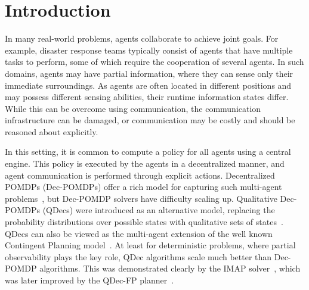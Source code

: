 \documentclass[letterpaper]{article} %
\theoremstyle{definition}
\begin{document}
\section{Introduction}

In many real-world problems, agents collaborate to achieve joint goals. For example, disaster response teams typically consist of agents that have multiple tasks to perform,
some of which require the cooperation of several agents.
In such domains, agents may have partial information, where they can sense only their immediate surroundings.
As agents are often located in different positions and may possess different sensing abilities, their runtime information states differ.  While this can be overcome using communication, the communication infrastructure can be damaged, or communication may be costly and should be reasoned about explicitly.

In this setting, it is common to compute a policy for all agents %
using a central engine.
This policy is executed by the agents in a decentralized manner, and agent communication is performed through explicit actions. Decentralized POMDPs (Dec-POMDPs) offer a rich model for capturing such multi-agent problems~\citep{Bernstein02,OliehoekA16}, but Dec-POMDP solvers have difficulty scaling up.  Qualitative Dec-POMDPs (QDecs) were introduced as an alternative model, replacing the
probability distributions over possible states with qualitative sets of states~\citep{BrafmanSZ13}.
QDecs can also be viewed as the multi-agent extension of the well known Contingent Planning model~\citep{hoffmann2005contingent}.
At least for deterministic problems, where partial observability plays the key role, QDec algorithms scale much better than Dec-POMDP algorithms.
This was demonstrated clearly by the IMAP solver~\citep{IMAP}, which was later improved
by the QDec-FP planner~\citep{ShekharBS19}.
\end{document}
